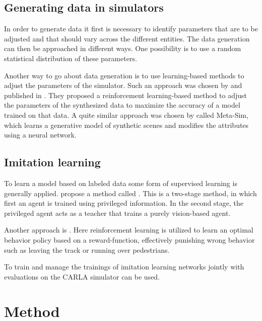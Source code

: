 \documentclass[conference, 11pt]{IEEEtran}
\begin{document}
\subsection{Generating data in simulators}

In order to generate data it first is necessary to identify parameters that are to be adjusted and that should vary across the different entities.
The data generation can then be approached in different ways.
One possibility is to use a random statistical distribution of these parameters. 

Another way to go about data generation is to use learning-based methods to adjust the parameters of the simulator.
Such an approach was chosen by \citeauthor{DBLP:LearningToSimulate} and published in  \cite{DBLP:LearningToSimulate}.
They proposed a reinforcement learning-based method to adjust the parameters of the synthesized data to maximize the accuracy of a model trained on that data.
A quite similar approach was chosen by \citeauthor{DBLP:Meta-Sim} \cite{DBLP:Meta-Sim} called Meta-Sim, which learns a generative model of synthetic scenes and modifies the attributes using a neural network.

\subsection{Imitation learning}

To learn a model based on labeled data some form of supervised learning is generally applied.
\citeauthor{Chen:LearningByCheating} propose a method called  \cite{Chen:LearningByCheating}.
This is a two-stage method, in which first an agent is trained using privileged information.
In the second stage, the privileged agent acts as a teacher that trains a purely vision-based agent.

Another approach is  \cite{Toromanoff_2020_CVPR}. Here reinforcement learning is utilized to learn an optimal behavior policy based on a reward-function, effectively punishing wrong behavior such as leaving the track or running over pedestrians.

To train and manage the trainings of imitation learning networks jointly with evaluations on the CARLA simulator  \cite{felipecode:coiltraine} can be used.

\section{Method}
\end{document}
